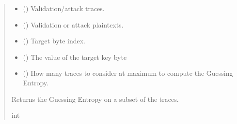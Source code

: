 \documentclass[letterpaper,10pt,english]{sphinxmanual}
\begin{document}
\begin{fulllineitems}
\begin{fulllineitems}
\begin{quote}
\begin{description}
\begin{itemize}
\item {} 
\sphinxAtStartPar
{} (\sphinxstyleliteralemphasis{\sphinxupquote{{[}}}\sphinxstyleliteralemphasis{\sphinxupquote{{[}}}\sphinxstyleliteralemphasis{\sphinxupquote{{]}}}\sphinxstyleliteralemphasis{\sphinxupquote{{]}}}) \textendash{} Validation/attack traces.

\item {} 
\sphinxAtStartPar
{} (\sphinxstyleliteralemphasis{\sphinxupquote{{[}}}\sphinxstyleliteralemphasis{\sphinxupquote{{[}}}\sphinxstyleliteralemphasis{\sphinxupquote{{]}}}\sphinxstyleliteralemphasis{\sphinxupquote{{]}}}) \textendash{} Validation or attack plaintexts.

\item {} 
\sphinxAtStartPar
{} () \textendash{} Target byte index.

\item {} 
\sphinxAtStartPar
{} () \textendash{} The value of the target key byte

\item {} 
\sphinxAtStartPar
{} (\sphinxstyleliteralemphasis{\sphinxupquote{, }}) \textendash{} How many traces to consider at maximum to compute the Guessing Entropy.

\end{itemize}

\sphinxAtStartPar
Returns the Guessing Entropy on a subset of the traces.

\sphinxAtStartPar
int

\end{description}\end{quote}

\end{fulllineitems}



\end{fulllineitems}
\end{document}
